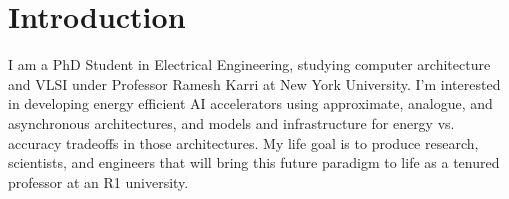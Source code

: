 \section{\textbf{Introduction}}
\vspace{1mm}

\small{
I am a PhD Student in Electrical Engineering, studying computer architecture and VLSI under Professor Ramesh Karri at New York University. I'm interested in developing energy efficient AI accelerators using approximate, analogue, and asynchronous architectures, and models and infrastructure for energy vs. accuracy tradeoffs in those architectures. My life goal is to produce research, scientists, and engineers that will bring this future paradigm to life as a tenured professor at an R1 university.
}

\vspace{-2mm}
